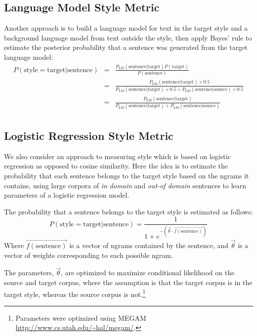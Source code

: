\documentclass[10pt,a5paper,twoside]{article}
\begin{document}
\subsection{Language Model Style Metric}
Another approach is to build a language model for text in the target style and a background language model from text outside the style, then apply Bayes' rule to estimate
the posterior probability that a sentence was generated from the target language model:
\begin{eqnarray*}
P(\text{style}=\text{target}|\text{sentence}) 
& = & \frac{P_\text{LM}(\text{sentence}|\text{target}) P(\text{target})}{P(\text{sentence})} \\
& = & \frac{P_\text{LM}(\text{sentence}|\text{target}) \times 0.5}{P_\text{LM}(\text{sentence}|\text{target}) \times 0.5 + P_\text{LM}(\text{sentence}|\text{source}) \times 0.5} \\
& = & \frac{P_\text{LM}(\text{sentence}|\text{target})}{P_\text{LM}(\text{sentence}|\text{target}) + P_\text{LM}(\text{sentence}|\text{source})} \\
\end{eqnarray*}

\subsection{Logistic Regression Style Metric}
We also consider an approach to measuring style which is based on logistic regression as opposed to cosine similarity.
Here the idea is to estimate the probability that each
sentence belongs to the target style based on the ngrams it contains, using large corpora of \emph{in domain} and \emph{out-of domain} sentences to learn  parameters of a logistic regression model.

The probability that a sentence belongs to the target style is estimated as follows:
\[
P(\text{style} = \text{target}|\text{sentence}) = \frac{1}{1 + e^{-\left( \vec{\theta} \cdot \vec{f(\text{sentence})} \right)}}
\]
Where $\vec{f(\text{sentence})}$ is a vector of ngrams contained by the sentence, and $\vec{\theta}$ is a vector of weights corresponding to each possible ngram.

The parameters, $\vec{\theta}$, are optimized to maximize conditional likelihood on the source and target corpus, where the assumption is that the target corpus
is in the target style, whereas the source corpus is not.\footnote{
  Parameters were optimized using MEGAM \url{http://www.cs.utah.edu/~hal/megam/}.
}
\end{document}
